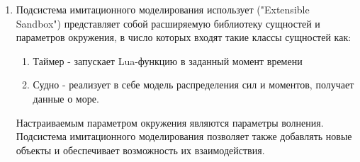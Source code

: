 \begin{enumerate}
	\item
	Подсистема имитационного моделирования использует ("Extensible Sandbox") 
	представляет собой расширяемую библиотеку сущностей и параметров окружения, 
	в число которых входят такие классы сущностей как:
	\begin{enumerate}
		\item	Таймер - запускает Lua-функцию в заданный момент времени
		\item	Судно - реализует в себе модель распределения сил 
				и моментов, получает данные о море.
	\end{enumerate}
	Настраиваемым параметром окружения являются параметры волнения.
	Подсистема имитационного моделирования позволяет также добавлять 
			новые объекты и обеспечивает возможность их взаимодействия.
\end{enumerate}


